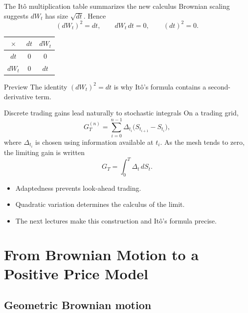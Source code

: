 \documentclass[10pt,aspectratio=169]{beamer}
\begin{document}
\begin{frame}{The It\^o multiplication table summarizes the new calculus}
Brownian scaling suggests \(dW_t\) has size \(\sqrt{dt}\). Hence
\[
(dW_t)^2=dt,
\qquad
dW_t\,dt=0,
\qquad
(dt)^2=0.
\]
\begin{center}
\begin{tabular}{c|cc}
\toprule
\(\times\) & \(dt\) & \(dW_t\)\\
\midrule
\(dt\) & \(0\) & \(0\)\\
\(dW_t\) & \(0\) & \(dt\)\\
\bottomrule
\end{tabular}
\end{center}
\begin{block}{Preview}
The identity \((dW_t)^2=dt\) is why It\^o's formula contains a second-derivative term.
\end{block}
\end{frame}

\begin{frame}{Discrete trading gains lead naturally to stochastic integrals}
On a trading grid,
\[
G_T^{(n)}
=\sum_{i=0}^{n-1}\Delta_{t_i}
\bigl(S_{t_{i+1}}-S_{t_i}\bigr),
\]
where \(\Delta_{t_i}\) is chosen using information available at \(t_i\).
As the mesh tends to zero, the limiting gain is written
\[
G_T=\int_0^T\Delta_t\,dS_t.
\]
\begin{itemize}
  \item Adaptedness prevents look-ahead trading.
  \item Quadratic variation determines the calculus of the limit.
  \item The next lectures make this construction and It\^o's formula precise.
\end{itemize}
\end{frame}

\section{From Brownian Motion to a Positive Price Model}
\subsection{Geometric Brownian motion}
\end{document}
